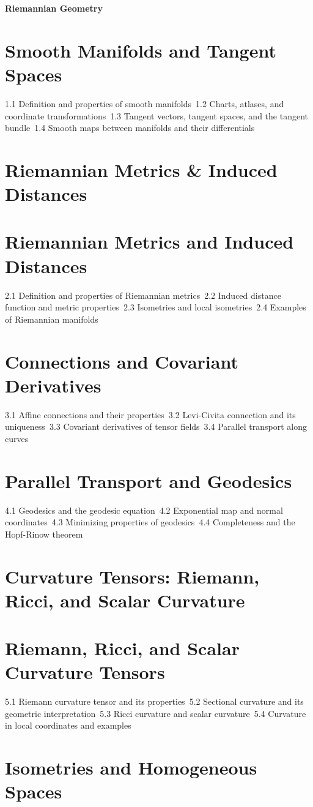 {\LARGE \bf{Riemannian Geometry}}
\section{Smooth Manifolds and Tangent Spaces}
1.1 Definition and properties of smooth manifolds\
1.2 Charts, atlases, and coordinate transformations\
1.3 Tangent vectors, tangent spaces, and the tangent bundle\
1.4 Smooth maps between manifolds and their differentials\
\section{Riemannian Metrics \& Induced Distances}
\section{Riemannian Metrics and Induced Distances}
2.1 Definition and properties of Riemannian metrics\
2.2 Induced distance function and metric properties\
2.3 Isometries and local isometries\
2.4 Examples of Riemannian manifolds\
\section{Connections and Covariant Derivatives}
3.1 Affine connections and their properties\
3.2 Levi-Civita connection and its uniqueness\
3.3 Covariant derivatives of tensor fields\
3.4 Parallel transport along curves\
\section{Parallel Transport and Geodesics}
4.1 Geodesics and the geodesic equation\
4.2 Exponential map and normal coordinates\
4.3 Minimizing properties of geodesics\
4.4 Completeness and the Hopf-Rinow theorem\
\section{Curvature Tensors: Riemann, Ricci, and Scalar Curvature}
\section{Riemann, Ricci, and Scalar Curvature Tensors}
5.1 Riemann curvature tensor and its properties\
5.2 Sectional curvature and its geometric interpretation\
5.3 Ricci curvature and scalar curvature\
5.4 Curvature in local coordinates and examples\
\section{Isometries and Homogeneous Spaces}
